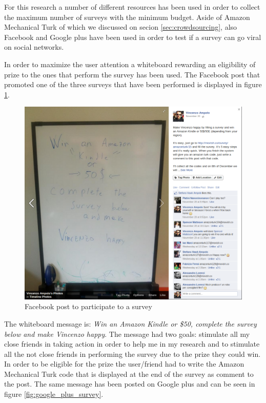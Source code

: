 For this research a number of different resources has been used in order to collect the maximum number of surveys with the minimum budget. Aside of Amazon Mechanical Turk of which we discussed on secion \ref{sec:crowdsourcing}, also Facebook and Google plus have been used in order to test if a survey can go viral on social networks.

In order to maximize the user attention a whiteboard rewarding an eligibility of prize to the ones that perform the survey has been used. The Facebook post that promoted one of the three surveys that have been performed is displayed in figure \ref{fig:facebook_survey}.

\begin{figure}
  \centering
  \includegraphics[width=\textwidth]{figures/facebook_survey.png}
  \caption{Facebook post to participate to a survey}
  \label{fig:facebook_survey}
\end{figure}

The whiteboard message is: \textit{Win an Amazon Kindle or \$50, complete the survey below and make Vincenzo happy}. The message had two goals: stimulate all my close friends in taking action in order to help me in my research and to stimulate all the not close friends in performing the survey due to the prize they could win. In order to be eligible for the prize the user/friend had to write the Amazon Mechanical Turk code that is displayed at the end of the survey as comment to the post.  The same message has been posted on Google plus and can be seen in figure \ref{fig:google_plus_survey}.

